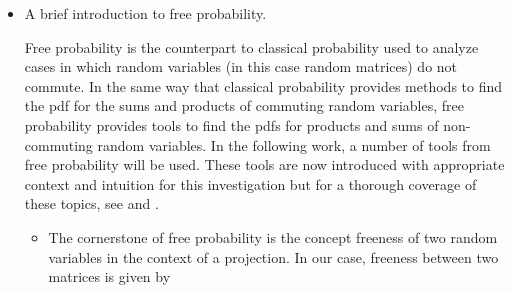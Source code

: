 \begin{itemize}

\item 
	A brief introduction to free probability.
	\par 
	Free probability is the counterpart to classical probability used to analyze cases in which random variables (in this case random matrices) do 
	not commute. In the same way that classical probability provides methods to find the pdf for the sums and products of commuting random
	 variables, free probability provides tools to find the pdfs for products and sums of non-commuting random variables.
	In the following work, a number of tools from free probability will be used. These tools are now introduced with appropriate context and intuition 
	for this investigation but for a thorough coverage of these topics, see \cite{tulino2004random} and \cite{mingo2017free}.
	 \begin{itemize}
	 \item 
	 	The cornerstone of free probability is the concept freeness of two random variables in the context of a projection. In our case, freeness between two 
	 	matrices is given by 


\end{itemize}
\end{itemize}
